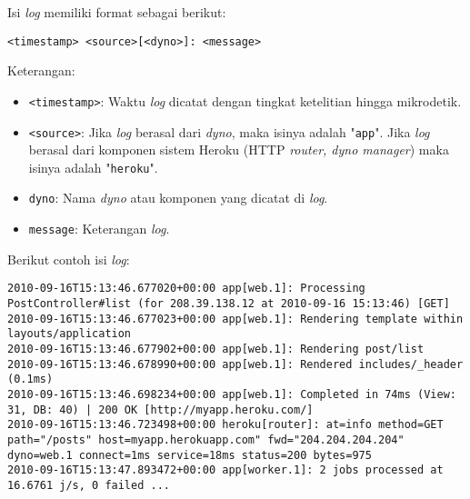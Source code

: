 Isi \textit{log} memiliki format sebagai berikut:
\begin{lstlisting}
<timestamp> <source>[<dyno>]: <message>
\end{lstlisting}
Keterangan:
\begin{itemize}
\item \texttt{<timestamp>}: Waktu \textit{log} dicatat dengan tingkat ketelitian hingga mikrodetik.
\item \texttt{<source>}: Jika \textit{log} berasal dari \textit{dyno}, maka isinya adalah "\texttt{app}". Jika \textit{log} berasal dari komponen sistem Heroku (HTTP \textit{router, dyno manager}) maka isinya adalah "\texttt{heroku}".
\item \texttt{dyno}: Nama \textit{dyno} atau komponen yang dicatat di \textit{log}.
\item \texttt{message}: Keterangan \textit{log}.
\end{itemize}

Berikut contoh isi \textit{log}:
\begin{lstlisting}
2010-09-16T15:13:46.677020+00:00 app[web.1]: Processing PostController#list (for 208.39.138.12 at 2010-09-16 15:13:46) [GET]
2010-09-16T15:13:46.677023+00:00 app[web.1]: Rendering template within layouts/application
2010-09-16T15:13:46.677902+00:00 app[web.1]: Rendering post/list
2010-09-16T15:13:46.678990+00:00 app[web.1]: Rendered includes/_header (0.1ms)
2010-09-16T15:13:46.698234+00:00 app[web.1]: Completed in 74ms (View: 31, DB: 40) | 200 OK [http://myapp.heroku.com/]
2010-09-16T15:13:46.723498+00:00 heroku[router]: at=info method=GET path="/posts" host=myapp.herokuapp.com" fwd="204.204.204.204" dyno=web.1 connect=1ms service=18ms status=200 bytes=975
2010-09-16T15:13:47.893472+00:00 app[worker.1]: 2 jobs processed at 16.6761 j/s, 0 failed ...
\end{lstlisting}

